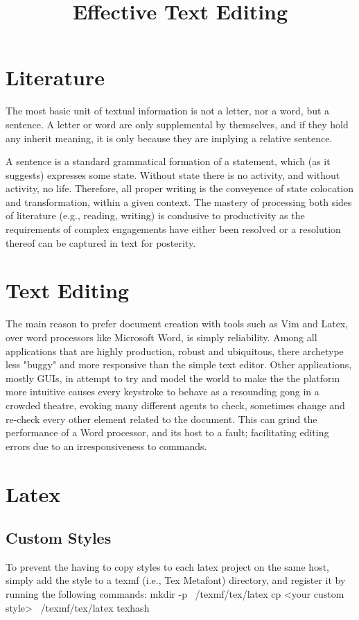 \documentclass{article}
\title{Effective Text Editing}
\begin{document}
\tableofcontents
\clearpage
\section{Literature}
The most basic unit of textual information is not a letter, nor a word, but a sentence.  A letter or word are only supplemental by themselves, and if they hold any inherit meaning, it is only because they are implying a relative sentence.

A sentence is a standard grammatical formation of a statement, which (as it suggests) expresses some state.  Without state there is no activity, and without activity, no life.  Therefore, all proper writing is the conveyence of state colocation and transformation, within a given context.  The mastery of processing both sides of literature (e.g., reading, writing) is condusive to productivity as the requirements of complex engagements have either been resolved or a resolution thereof can be captured in text for posterity.

\section{Text Editing}
The main reason to prefer document creation with tools such as Vim and Latex, over word processors like Microsoft Word, is simply reliability.  Among all applications that are highly production, robust and ubiquitous, there archetype less "buggy" and more responsive than the simple text editor.  Other applications, mostly GUIs, in attempt to try and model the world to make the the platform more intuitive causes every keystroke to behave as a resounding gong in a crowded theatre, evoking many different agents to check, sometimes change and re-check every other element related to the document.  This can grind the performance of a Word processor, and its host to a fault; facilitating editing errors due to an irresponsiveness to commands. 

\section{Latex}
\subsection{Custom Styles}
To prevent the having to copy styles to each latex project on the same host, simply add the style to a texmf (i.e., Tex Metafont) directory, and register it by running the following commands:
mkdir -p ~/texmf/tex/latex
cp <your custom style> ~/texmf/tex/latex
texhash
\end{document}

